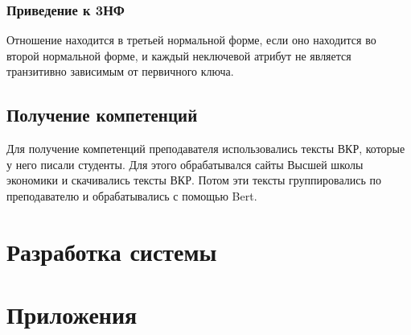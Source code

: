 \documentclass[PI,KR]{HSEUniversity}
\begin{document}
\subsection{Приведение к 3НФ}
Отношение находится в третьей нормальной форме, если оно находится во второй нормальной форме, и каждый неключевой атрибут не является транзитивно зависимым от первичного ключа.
\section{Получение компетенций}
Для получение компетенций преподавателя использовались тексты ВКР, которые у него писали студенты. Для этого обрабатывался сайты Высшей школы экономики и скачивались тексты ВКР. Потом эти тексты группировались по преподавателю и обрабатывались с помощью Bert. 
\chapter{Разработка системы}


\putbibliography %

\chapter*{Приложения}
\end{document}

